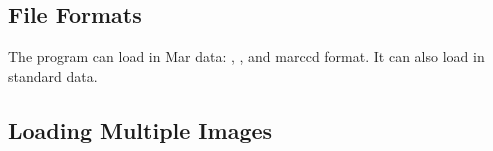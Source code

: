 \subsection{File Formats}

The program can load in Mar data: , 
, and  marccd format.
It can also load in standard  data.

\subsection{Loading Multiple Images}


